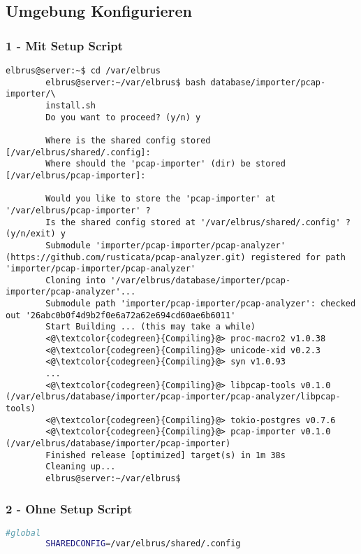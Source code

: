 \documentclass{article}
\begin{document}
	\subsection[file config]{Umgebung Konfigurieren}
	\subsubsection{1 - Mit Setup Script}
	\begin{lstlisting}[caption={Ausführen des 'install.sh' Scripts.}, breaklines=true,]
		elbrus@server:~$ cd /var/elbrus
		elbrus@server:~/var/elbrus$ bash database/importer/pcap-importer/\
		install.sh
		Do you want to proceed? (y/n) y
		
		Where is the shared config stored [/var/elbrus/shared/.config]: 
		Where should the 'pcap-importer' (dir) be stored [/var/elbrus/pcap-importer]: 
		
		Would you like to store the 'pcap-importer' at '/var/elbrus/pcap-importer' ?
		Is the shared config stored at '/var/elbrus/shared/.config' ? (y/n/exit) y
		Submodule 'importer/pcap-importer/pcap-analyzer' (https://github.com/rusticata/pcap-analyzer.git) registered for path 'importer/pcap-importer/pcap-analyzer'
		Cloning into '/var/elbrus/database/importer/pcap-importer/pcap-analyzer'...
		Submodule path 'importer/pcap-importer/pcap-analyzer': checked out '26abc0b0f4d9b2f0e6a72a62e694cd60ae6b6011'
		Start Building ... (this may take a while)
		<@\textcolor{codegreen}{Compiling}@> proc-macro2 v1.0.38
		<@\textcolor{codegreen}{Compiling}@> unicode-xid v0.2.3
		<@\textcolor{codegreen}{Compiling}@> syn v1.0.93
		...
		<@\textcolor{codegreen}{Compiling}@> libpcap-tools v0.1.0 (/var/elbrus/database/importer/pcap-importer/pcap-analyzer/libpcap-tools)
		<@\textcolor{codegreen}{Compiling}@> tokio-postgres v0.7.6
		<@\textcolor{codegreen}{Compiling}@> pcap-importer v0.1.0 (/var/elbrus/database/importer/pcap-importer)
		Finished release [optimized] target(s) in 1m 38s
		Cleaning up...
		elbrus@server:~/var/elbrus$
	\end{lstlisting}
	
	\newpage
	\subsubsection{2 - Ohne Setup Script}	
	\lstset{style=files}
	\begin{lstlisting}[caption={Anhand von '.env.example' eigene '.env' Datei anlegen.}, language=bash]
		#global
		SHAREDCONFIG=/var/elbrus/shared/.config
	\end{lstlisting}
\end{document}
